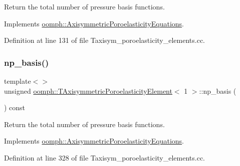 Return the total number of pressure basis functions. 



Implements \hyperlink{classoomph_1_1AxisymmetricPoroelasticityEquations_a8a17486deaa1115a98608e76344aa67c}{oomph\+::\+Axisymmetric\+Poroelasticity\+Equations}.



Definition at line 131 of file Taxisym\+\_\+poroelasticity\+\_\+elements.\+cc.

\mbox{\label{classoomph_1_1TAxisymmetricPoroelasticityElement_a27b709b447e969125867e32c4fb5e10e}} 
\subsubsection{\texorpdfstring{np\+\_\+basis()}{np\_basis()}\hspace{0.1cm}{\footnotesize\ttfamily [2/3]}}
{\footnotesize\ttfamily template$<$$>$ \\
unsigned \hyperlink{classoomph_1_1TAxisymmetricPoroelasticityElement}{oomph\+::\+T\+Axisymmetric\+Poroelasticity\+Element}$<$ 1 $>$\+::np\+\_\+basis (\begin{DoxyParamCaption}{ }\end{DoxyParamCaption}) const\hspace{0.3cm}{\ttfamily [virtual]}}



Return the total number of pressure basis functions. 



Implements \hyperlink{classoomph_1_1AxisymmetricPoroelasticityEquations_a8a17486deaa1115a98608e76344aa67c}{oomph\+::\+Axisymmetric\+Poroelasticity\+Equations}.



Definition at line 328 of file Taxisym\+\_\+poroelasticity\+\_\+elements.\+cc.

\mbox{\label{classoomph_1_1TAxisymmetricPoroelasticityElement_ae1fdf6e051bbc93b8c485f1d3f9fb9c6}} 
